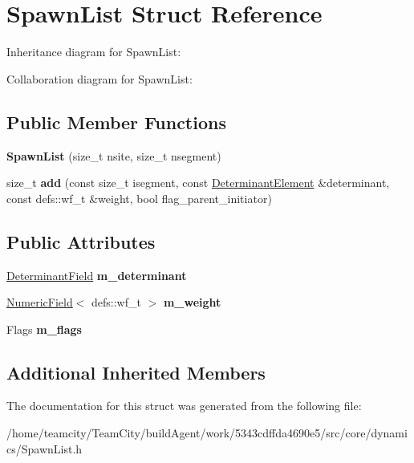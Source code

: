 \hypertarget{structSpawnList}{}\section{Spawn\+List Struct Reference}
\label{structSpawnList}


Inheritance diagram for Spawn\+List\+:


Collaboration diagram for Spawn\+List\+:
\subsection*{Public Member Functions}
\begin{DoxyCompactItemize}
\item 
{\bfseries Spawn\+List} (size\+\_\+t nsite, size\+\_\+t nsegment)\hypertarget{structSpawnList_a08e6bb3de513d717a5b1708c41ec8b27}{}\label{structSpawnList_a08e6bb3de513d717a5b1708c41ec8b27}

\item 
size\+\_\+t {\bfseries add} (const size\+\_\+t isegment, const \hyperlink{classDeterminantElement}{Determinant\+Element} \&determinant, const defs\+::wf\+\_\+t \&weight, bool flag\+\_\+parent\+\_\+initiator)\hypertarget{structSpawnList_ac2cc472faaa9e061d5113c748b134d63}{}\label{structSpawnList_ac2cc472faaa9e061d5113c748b134d63}

\end{DoxyCompactItemize}
\subsection*{Public Attributes}
\begin{DoxyCompactItemize}
\item 
\hyperlink{classDeterminantField}{Determinant\+Field} {\bfseries m\+\_\+determinant}\hypertarget{structSpawnList_a5274f5e4867bb8017d9dab9ec57aaf13}{}\label{structSpawnList_a5274f5e4867bb8017d9dab9ec57aaf13}

\item 
\hyperlink{classNumericField}{Numeric\+Field}$<$ defs\+::wf\+\_\+t $>$ {\bfseries m\+\_\+weight}\hypertarget{structSpawnList_a7fc6a9d47e7440aa0369131e7682d9e2}{}\label{structSpawnList_a7fc6a9d47e7440aa0369131e7682d9e2}

\item 
Flags {\bfseries m\+\_\+flags}\hypertarget{structSpawnList_af285fbe90cb99c8ffbb2c9b1bd3fe25a}{}\label{structSpawnList_af285fbe90cb99c8ffbb2c9b1bd3fe25a}

\end{DoxyCompactItemize}
\subsection*{Additional Inherited Members}


The documentation for this struct was generated from the following file\+:\begin{DoxyCompactItemize}
\item 
/home/teamcity/\+Team\+City/build\+Agent/work/5343cdffda4690e5/src/core/dynamics/Spawn\+List.\+h\end{DoxyCompactItemize}

